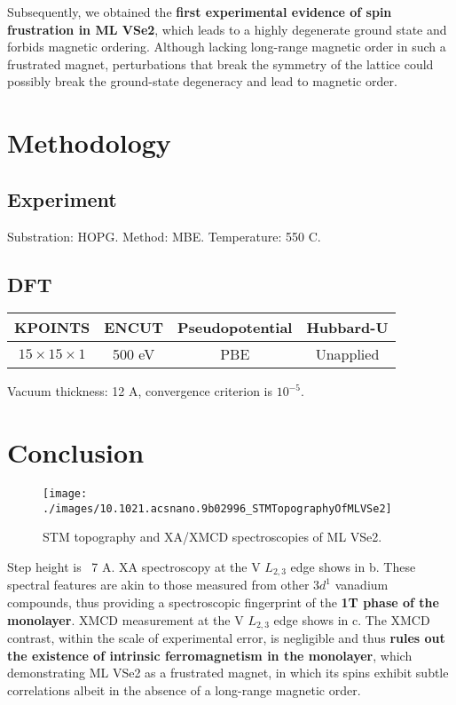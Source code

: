 Subsequently, we obtained the \textbf{first experimental evidence of spin frustration in ML VSe2}, which leads to a highly degenerate ground state and forbids magnetic ordering. Although lacking long-range magnetic order in such a frustrated magnet, perturbations that break the symmetry of the lattice could possibly break the ground-state degeneracy and lead to magnetic order.

\section{Methodology}

\subsection{Experiment}
Substration: HOPG. Method: MBE. Temperature: 550 C.

\subsection{DFT}
\begin{table}[h]
    \begin{tabular}{cccc}
    \toprule
    KPOINTS                 & ENCUT  & Pseudopotential & Hubbard-U \\
    \midrule
    $15 \times 15 \times 1$ & 500 eV & PBE             & Unapplied  \\
    \bottomrule
    \end{tabular}
\end{table}
Vacuum thickness: 12 A, convergence criterion is $10^{-5}$.
\section{Conclusion}

\begin{figure}[ht] 
    \texttt{[image: ./images/10.1021.acsnano.9b02996\_STMTopographyOfMLVSe2]}
	\caption[STM topography and XA/XMCD spectroscopies of ML VSe2]{
        STM topography and XA/XMCD spectroscopies of ML VSe2.
	}
\end{figure}

Step height is ~7 A. XA spectroscopy at the V $L_{2,3}$ edge shows in b. These spectral features are akin to those measured from other $3d^1$ vanadium compounds, thus providing a spectroscopic fingerprint of the \textbf{1T phase of the monolayer}. XMCD measurement at the V $L_{2,3}$ edge shows in c. The XMCD contrast, within the scale of experimental error, is negligible and thus \textbf{rules out the existence of intrinsic ferromagnetism in the monolayer}, which demonstrating ML VSe2 as a frustrated magnet, in which its spins exhibit subtle correlations albeit in the absence of a long-range magnetic order.

